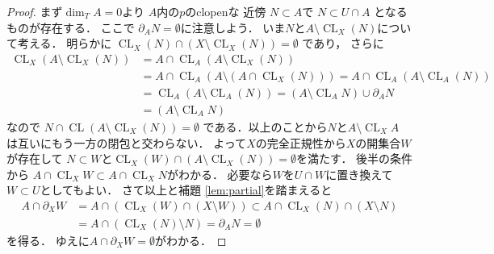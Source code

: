 \documentclass[leqno, a4paper, 12pt]{jsarticle}
\DeclareMathOperator{\cl}{CL}
\begin{document}
\begin{proof}
まず$\dim_{T}A=0$より
$A$内の$p$のclopenな
近傍
$N\subset A$で
$N\subset U\cap A$
となるものが存在する．
ここで
$\partial_{A}N=\emptyset$に注意しよう．
いま$N$と$A\setminus \cl_{X}(N)$について考える．
明らかに
$\cl_{X}(N)\cap (X\setminus \cl_{X}(N))=\emptyset$
であり，
さらに
\begin{align*}
\cl_{X}(A\setminus \cl_{X}(N))
&=
A\cap \cl_{A}(A\setminus \cl_{X}(N))
\\
&=
A\cap \cl_{A}(A\setminus (A\cap \cl_{X}(N)))
=
A\cap \cl_{A}(A\setminus \cl_{A}(N))\\
&=
\cl_{A}(A\setminus \cl_{A}(N))
=
(A\setminus \cl_{A} N)\cup \partial_{A} N
\\
&=(A\setminus \cl_{A} N)
\end{align*}
なので
$N\cap \cl(A\setminus \cl_{X}(N))=\emptyset$
である．以上のことから$N$と$A\setminus \cl_{X}A$
は互いにもう一方の閉包と交わらない．
よって$X$の完全正規性から$X$の開集合$W$が存在して
$N\subset W$と$\cl_{X}(W)\cap (A\setminus \cl_{X}(N))=\emptyset$を満たす．
後半の条件から
$A\cap \cl_{X}W\subset A\cap \cl_{X}N$がわかる．
必要なら$W$を$U\cap W$に置き換えて$W\subset U$としてもよい．
さて以上と補題 \ref{lem:partial}を踏まえると
\begin{align*}
A\cap 
\partial_{X} W
&=
A\cap (\cl_{X}(W)\cap (X\setminus W))
\subset 
A\cap \cl_{X}(N)\cap (X\setminus N)
\\
&=A\cap (\cl_{X}(N)\setminus N)
=\partial_{A}N=\emptyset
\end{align*}
を得る．
ゆえに$A\cap \partial_{X} W=\emptyset$がわかる．
\end{proof}
\end{document}
